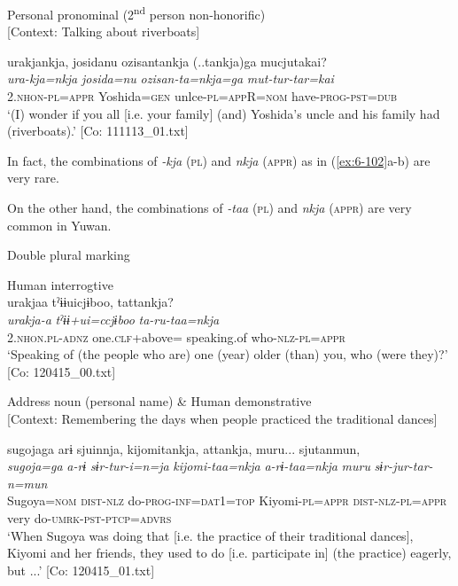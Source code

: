 \ex Personal pronominal (2\textsuperscript{nd} person non-honorific)\\{}
[Context: Talking about riverboats]

{\TM}
\glll urakjankja,  josidanu  ozisantankja (..tankja)ga     mucjutakai?\\
      \textit{ura-kja=nkja}  \textit{josida=nu}  \textit{ozisan-ta=nkja=ga}   \textit{mut-tur-tar=kai}\\
      2.\textsc{nhon}-\textsc{pl}=\textsc{appr}  Yoshida=\textsc{gen}  unlce-\textsc{pl}=\textsc{app}R=\textsc{nom}  have-\textsc{prog}-\textsc{pst}=\textsc{dub}\\
\glt ‘(I) wonder if you all [i.e. your family] (and) Yoshida’s uncle and his family had (riverboats).’ [Co: 111113\_01.txt]
\z

In fact, the combinations of \textit{-kja} (\textsc{pl}) and \textit{nkja} (\textsc{appr}) as in (\ref{ex:6-102}a-b) are very rare.

On the other hand, the combinations of \textit{-taa} (\textsc{pl}) and \textit{nkja} (\textsc{appr}) are very common in Yuwan.

\ea\label{ex:6-103}
  Double plural marking

 \ea Human interrogtive\\
{\TM}
\glll  urakjaa  tˀɨɨuicjɨboo,  tattankja?\\
\textit{urakja-a}  \textit{tˀɨɨ+ui=ccjɨboo}  \textit{ta-ru-taa=nkja}\\
2.\textsc{nhon}.\textsc{pl}-\textsc{adnz}  one.\textsc{clf}+above= speaking.of  who-\textsc{nlz}-\textsc{pl}=\textsc{appr}\\
\glt ‘Speaking of (the people who are) one (year) older (than) you, who (were they)?’ [Co: 120415\_00.txt]
\z

\ex Address noun (personal name) \& Human demonstrative\\{}
[Context: Remembering the days when people practiced the traditional dances]

{\TM}
\glll sugojaga  arɨ  sjuinnja,  kijomitankja,   attankja,  muru...  sjutanmun,\\
      \textit{sugoja=ga}  \textit{a-rɨ}  \textit{sɨr-tur-i=n=ja}  \textit{kijomi-taa=nkja}    \textit{a-rɨ-taa=nkja}  \textit{muru}  \textit{sɨr-jur-tar-n=mun}\\
      Sugoya=\textsc{nom}  \textsc{dist}-\textsc{nlz}  do-\textsc{prog}-\textsc{inf}=\textsc{dat}1=\textsc{top}  Kiyomi-\textsc{pl}=\textsc{appr}      \textsc{dist}-\textsc{nlz}-\textsc{pl}=\textsc{appr}  very  do-\textsc{umrk}-\textsc{pst}-\textsc{ptcp}=\textsc{advrs}\\
\glt ‘When Sugoya was doing that [i.e. the practice of their traditional dances], Kiyomi and her friends, they used to do [i.e. participate in] (the practice) eagerly, but ...’ [Co: 120415\_01.txt]
\z

